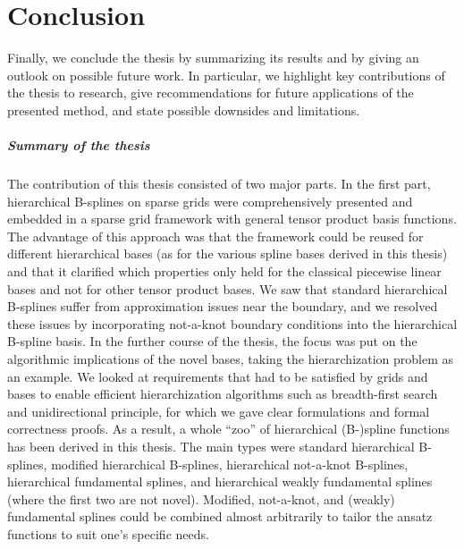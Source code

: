 \chapter{Conclusion}
\label{chap:90conclusion}

\noindent
Finally, we conclude the thesis by summarizing its results
and by giving an outlook on possible future work.
In particular, we highlight key contributions of the thesis to research,
give recommendations for future applications of the presented method, and
state possible downsides and limitations.

\vspace*{-0.5em}

\paragraph{Summary of the thesis}

The contribution of this thesis consisted of two major parts.
In the first part,
hierarchical B-splines on sparse grids were comprehensively presented
and embedded in a sparse grid framework with general
tensor product basis functions.
The advantage of this approach was that the framework could be reused
for different hierarchical bases
(as for the various spline bases derived in this thesis)
and that it clarified which properties only held for the
classical piecewise linear bases and not for other tensor product bases.
We saw that standard hierarchical B-splines suffer from
approximation issues near the boundary, and
we resolved these issues by incorporating not-a-knot boundary conditions
into the hierarchical B-spline basis.
In the further course of the thesis,
the focus was put on the algorithmic implications of the novel bases,
taking the hierarchization problem as an example.
We looked at requirements that had to be satisfied by grids and bases
to enable efficient hierarchization algorithms
such as breadth-first search and unidirectional principle,
for which we gave clear formulations and formal correctness proofs.
As a result, a whole ``zoo'' of hierarchical (B-)spline functions
has been derived in this thesis.
The main types were
standard hierarchical B-splines,
modified hierarchical B-splines,
hierarchical not-a-knot B-splines,
hierarchical fundamental splines, and
hierarchical weakly fundamental splines
(where the first two are not novel).
Modified, not-a-knot, and (weakly) fundamental splines could be combined
almost arbitrarily to tailor the ansatz functions to suit one's specific needs.

\pagebreak

